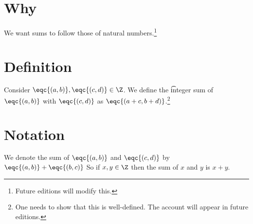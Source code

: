 
\section*{Why}

We want sums to follow those of natural numbers.\footnote{Future editions will modify this.}

\section*{Definition}

Consider $\eqc{(a, b)}, \eqc{(c, d)} \in \Z $.
We define the \t{integer sum} of $\eqc{(a, b)}$ with $\eqc{(c, d)}$ as $\eqc{(a + c, b + d)}$.\footnote{One needs to show that this is well-defined. The account will appear in future editions.}

\section*{Notation}

We denote the sum of $\eqc{(a, b)}$ and $\eqc{(c, d)}$ by $\eqc{(a, b)} + \eqc{(b, c)}$
So if $x, y \in \Z $ then the sum of $x$ and $y$ is $x + y$.

\blankpage